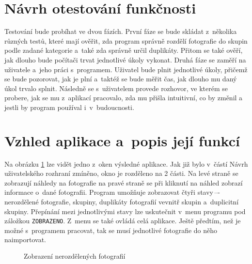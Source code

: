 \section{Návrh otestování funkčnosti}

Testování bude probíhat ve dvou fázích. První fáze se bude skládat z~několika různých testů, které mají ověřit, zda program správně rozdělí fotografie do skupin podle zadané kategorie a~také zda správně určil duplikáty. Přitom se také ověří, jak dlouho bude počítači trvat jednotlivé úkoly vykonat. 
Druhá fáze se zaměří na uživatele a~jeho práci s~programem. Uživatel bude plnit jednotlivé úkoly, přičemž se bude pozorovat, jak je plní a~taktéž se bude měřit čas, jak dlouho mu daný úkol trvalo splnit. Následně se s~uživatelem provede rozhovor, ve kterém se probere, jak se mu z~aplikací pracovalo, zda mu přišla intuitivní, co by změnil a jestli by program používal i~v~budoucnosti.

\section{Vzhled aplikace a~popis její funkcí}
Na obrázku \ref{VSE_P} lze vidět jedno z~oken výsledné aplikace. Jak již bylo v~částí Návrh uživatelského rozhraní zmíněno, okno je rozděleno na 2 části. Na levé straně se zobrazují náhledy na fotografie na pravé straně se při kliknutí na náhled zobrazí informace o~dané fotografii. Program umožňuje zobrazovat čtyři stavy\,–-\,nerozdělené fotografie, skupiny, duplikáty fotografií vevnitř skupin a~duplicitní skupiny. Přepínání mezi jednotlivými stavy lze uskutečnit v~menu programu pod záložkou \texttt{ZOBRAZENO}. Z~menu se také ovládá celá aplikace. Ještě předtím, než je možné s~programem pracovat, tak se musí jednotlivé fotografie do něho naimportovat.

\begin{figure}[h]
\begin{center}
\caption{Zobrazení nerozdělených fotografií}
\label{VSE_P}
\end{center}
\end{figure}

